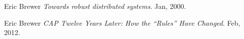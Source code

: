 \documentclass[10pt,twocolumn]{article}
\begin{document}
%
%
%
%



\begin{thebibliography}{9}
Eric Brewer
\textit{Towards robust distributed systems}. Jan, 2000.

Eric Brewer
\textit{CAP Twelve Years Later: How the “Rules” Have Changed}. Feb, 2012.
\end{thebibliography}
\end{document}
